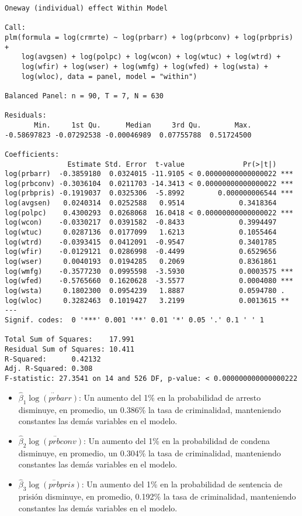 \documentclass[
  12pt,
]{article}
\begin{document}
\begin{verbatim}
Oneway (individual) effect Within Model

Call:
plm(formula = log(crmrte) ~ log(prbarr) + log(prbconv) + log(prbpris) + 
    log(avgsen) + log(polpc) + log(wcon) + log(wtuc) + log(wtrd) + 
    log(wfir) + log(wser) + log(wmfg) + log(wfed) + log(wsta) + 
    log(wloc), data = panel, model = "within")

Balanced Panel: n = 90, T = 7, N = 630

Residuals:
       Min.     1st Qu.      Median     3rd Qu.        Max. 
-0.58697823 -0.07292538 -0.00046989  0.07755788  0.51724500 

Coefficients:
               Estimate Std. Error  t-value              Pr(>|t|)    
log(prbarr)  -0.3859180  0.0324015 -11.9105 < 0.00000000000000022 ***
log(prbconv) -0.3036104  0.0211703 -14.3413 < 0.00000000000000022 ***
log(prbpris) -0.1919037  0.0325306  -5.8992        0.000000006544 ***
log(avgsen)   0.0240314  0.0252588   0.9514             0.3418364    
log(polpc)    0.4300293  0.0268068  16.0418 < 0.00000000000000022 ***
log(wcon)    -0.0330217  0.0391582  -0.8433             0.3994497    
log(wtuc)     0.0287136  0.0177099   1.6213             0.1055464    
log(wtrd)    -0.0393415  0.0412091  -0.9547             0.3401785    
log(wfir)    -0.0129121  0.0286998  -0.4499             0.6529656    
log(wser)     0.0040193  0.0194285   0.2069             0.8361861    
log(wmfg)    -0.3577230  0.0995598  -3.5930             0.0003575 ***
log(wfed)    -0.5765660  0.1620628  -3.5577             0.0004080 ***
log(wsta)     0.1802300  0.0954239   1.8887             0.0594780 .  
log(wloc)     0.3282463  0.1019427   3.2199             0.0013615 ** 
---
Signif. codes:  0 '***' 0.001 '**' 0.01 '*' 0.05 '.' 0.1 ' ' 1

Total Sum of Squares:    17.991
Residual Sum of Squares: 10.411
R-Squared:      0.42132
Adj. R-Squared: 0.308
F-statistic: 27.3541 on 14 and 526 DF, p-value: < 0.000000000000000222
\end{verbatim}

\begin{itemize}
\item
  \(\hat{\beta}_1\stackrel{..}{\log(prbarr)}\): Un aumento del 1\% en la
  probabilidad de arresto disminuye, en promedio, un 0.386\% la tasa de
  criminalidad, manteniendo constantes las demás variables en el modelo.
\item
  \(\hat{\beta}_2\stackrel{..}{\log(prbconv)}\): Un aumento del 1\% en
  la probabilidad de condena disminuye, en promedio, un 0.304\% la tasa
  de criminalidad, manteniendo constantes las demás variables en el
  modelo.
\item
  \(\hat{\beta}_3\stackrel{..}{\log(prbpris)}\): Un aumento del 1\% en
  la probabilidad de sentencia de prisión disminuye, en promedio,
  0.192\% la tasa de criminalidad, manteniendo constantes las demás
  variables en el modelo.
\end{itemize}
\end{document}
